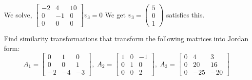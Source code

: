 \documentclass[11pt]{article}
\begin{document}
We solve, $\begin{bmatrix}
    -2 & 4 & 10 \\
    0 & -1 & 0 \\
    0 & 0 & 0
\end{bmatrix}v_3 = 0$
We get $v_3 = \begin{pmatrix}
    5 \\ 0 \\ 1
\end{pmatrix}$ satisfies this.

Find similarity transformations that transform the following matrices into
Jordan form:
$$
A_1 = \begin{bmatrix}
    0 & 1 & 0 \\
    0 & 0 & 1 \\
    -2 & -4 & -3
\end{bmatrix}, \; A_2 = \begin{bmatrix}
    1 & 0 & -1 \\
    0 & 1 & 0 \\
    0 & 0 & 2
\end{bmatrix}, \; A_3 = \begin{bmatrix}
    0 & 4 & 3 \\
    0 & 20 & 16 \\
    0 & -25 & -20
\end{bmatrix}
$$

\soln
\end{document}
